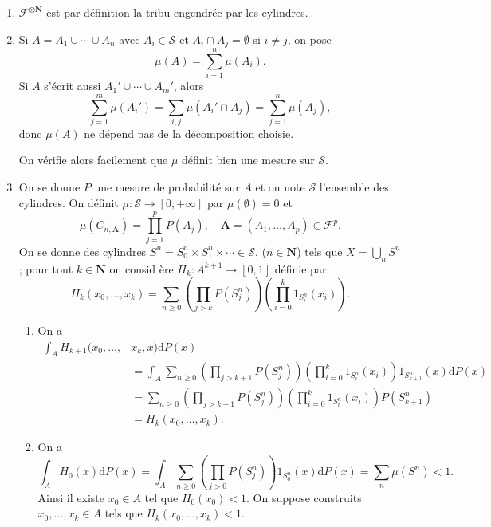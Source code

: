 \documentclass[a4paper,12pt,openany]{article}
\theoremstyle{plain}
\theoremstyle{definition}
\newcommand{\dd}{\mathrm{d}}
\newcommand{\N}{\mathbf{N}}
\newcommand{\Fcal}{\mathcal{F}}
\newcommand{\Scal}{\mathcal{S}}
\begin{document}
\begin{enumerate}
\item $\Fcal^{\otimes \N}$ est par d\'efinition la tribu engendr\'ee par les cylindres.
\item Si $A = A_1 \cup \cdots \cup A_n$ avec $A_i \in \Scal$ et $A_i \cap A_j = \emptyset$ si $i \neq j$, on pose
$$
\mu(A) = \sum_{i=1}^n \mu(A_i).
$$
Si $A$ s'\'ecrit aussi $A_1' \cup \cdots \cup A_m'$, alors
$$
\sum_{j=1}^m \mu(A_i') = \sum_{i,j} \mu(A_i' \cap A_j) = \sum_{j=1}^n \mu(A_j),
$$
donc $\mu(A)$ ne d\'epend pas de la d\'ecomposition choisie.

\vspace{0.2cm}
On v\'erifie alors facilement que $\mu$ d\'efinit bien une mesure sur $\Scal.$

\item On se donne $P$ une mesure de probabilit\'e sur $A$ et on note $\Scal$ l'ensemble des cylindres. On d\'efinit $\mu : \Scal \to [0, +\infty]$ par $\mu(\emptyset) = 0$ et
\begin{equation}\label{eq:prod}
\mu\left(C_{n,\mathbf{A}}\right) = \prod_{j=1}^p P(A_j), \quad \mathbf{A} = (A_1, \dots, A_p) \in \mathcal{F}^p.
\end{equation}
On se donne des cylindres $S^n = S^n_0 \times S^n_1 \times \cdots \in \Scal$, ($n \in \N$) tels que $X= \bigcup_n S^n$ ; pour tout $k \in \N$ on consid \`ere
$
H_k : A^{k+1} \to [0,1]
$
d\'efinie par
$$
H_k(x_0, \dots, x_k) = \sum_{n \geq 0} \left( \prod_{j > k} P(S^n_j)\right)\left(\prod_{i=0}^k 1_{S^n_i}(x_i)\right).
$$
\begin{enumerate}
\item On a
$$
\begin{aligned}
\int_A H_{k+1}(x_0, \dots, &x_k, x) \dd P(x) \\
&= \int_A  \sum_{n \geq 0} \left( \prod_{j > k+1} P(S^n_j)\right)\left(\prod_{i=0}^{k} 1_{S^n_i}(x_i)\right) 1_{S^n_{k+1}}(x) \dd P(x) \\
&= \sum_{n \geq 0} \left( \prod_{j > k+1} P(S^n_j)\right)\left(\prod_{i=0}^{k} 1_{S^n_i}(x_i)\right) P(S^n_{k+1}) \\
&= H_k(x_0, \dots, x_k).
\end{aligned}
$$
\item On a 
$$
\int_A H_0(x) \dd P(x) = \int_A \sum_{n \geq 0} \left( \prod_{j >0} P(S^n_j)\right)1_{S^n_0}(x)\dd P(x) = \sum_n \mu(S^n) < 1.
$$
Ainsi il existe $x_0 \in A$ tel que $H_0(x_0) < 1.$ On suppose construits $x_0, \dots, x_k \in A$ tels que $H_k(x_0, \dots, x_k) < 1.$
\vspace{0.2cm}

\end{enumerate}
\end{enumerate}
\end{document}
